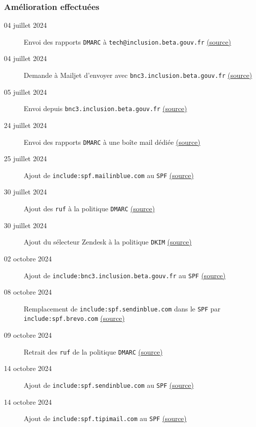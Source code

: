 \documentclass{beamer}
\begin{document}
\begin{frame}[fragile]
    \frametitle{Amélioration effectuées}
    \begin{description}
        \item[\footnotesize 04 juillet 2024] \small Envoi des rapports \texttt{DMARC} à \texttt{tech@inclusion.beta.gouv.fr} \href{https://itou-inclusion.slack.com/archives/C0412CTV63D/p1720017179142469}{(source)}
        \item[\footnotesize 04 juillet 2024] \small Demande à Mailjet d'envoyer avec \texttt{bnc3.inclusion.beta.gouv.fr} \href{https://app.mailjet.com/support/ticket/3086287}{(source)}
        \item[\footnotesize 05 juillet 2024] \small Envoi depuis \texttt{bnc3.inclusion.beta.gouv.fr} \href{https://app.mailjet.com/support/ticket/3086287}{(source)}
        \item[\footnotesize 24 juillet 2024] \small Envoi des rapports \texttt{DMARC} à une boîte mail dédiée \href{https://itou-inclusion.slack.com/archives/C0412CTV63D/p1721642195612449}{(source)}
        \item[\footnotesize 25 juillet 2024] \small Ajout de \texttt{include:spf.mailinblue.com} au \texttt{SPF} \href{https://mattermost.incubateur.net/betagouv/pl/cd8qzuqf63g7pxx61atwxs5hby}{(source)}
        \item[\footnotesize 30 juillet 2024] \small Ajout des \texttt{ruf} à la politique \texttt{DMARC} \href{https://itou-inclusion.slack.com/archives/C0412CTV63D/p1722332747632659}{(source)}
        \item[\footnotesize 30 juillet 2024] \small Ajout du sélecteur Zendesk à la politique \texttt{DKIM} \href{https://itou-inclusion.slack.com/archives/C01AQKD7MAN/p1722332999335309}{(source)}
        \item[\footnotesize 02 octobre 2024] \small Ajout de \texttt{include:bnc3.inclusion.beta.gouv.fr} au \texttt{SPF} \href{https://itou-inclusion.slack.com/docs/TQ3MK2T9S/F07Q3HANGTE}{(source)}
        \item[\footnotesize 08 octobre 2024] \small Remplacement de \texttt{include:spf.sendinblue.com} dans le \texttt{SPF} par \texttt{include:spf.brevo.com} \href{https://mattermost.incubateur.net/betagouv/pl/8ys763r4ijygb81asch4sf5kxc}{(source)}
        \item[\footnotesize 09 octobre 2024] \small Retrait des \texttt{ruf} de la politique \texttt{DMARC} \href{https://itou-inclusion.slack.com/archives/C0412CTV63D/p1728461567901209}{(source)}
        \item[\footnotesize 14 octobre 2024] \small Ajout de \texttt{include:spf.sendinblue.com} au \texttt{SPF} \href{https://itou-inclusion.slack.com/archives/C0412CTV63D/p1728907637846489}{(source)}
        \item[\footnotesize 14 octobre 2024] \small Ajout de \texttt{include:spf.tipimail.com} au \texttt{SPF} \href{https://www.notion.so/gip-inclusion/Tri-Tech-3-14-10-2024-31e7a9eb90ce4f15b09830bcf1630ab6?pvs=4#11f5f321b6048010ba67f27862cf9d60}{(source)}
    \end{description}
\end{frame}
\end{document}
